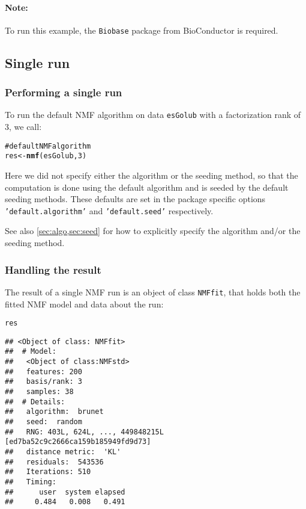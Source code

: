 \documentclass[a4paper]{article}\usepackage{graphicx, color}
\makeatletter
\newcommand{\hlfunctioncall}[1]{\textcolor[rgb]{0.501960784313725,0,0.329411764705882}{\textbf{#1}}}%
\newcommand{\hlcomment}[1]{\textcolor[rgb]{0.180392156862745,0.6,0.341176470588235}{#1}}%
\newenvironment{kframe}{%
 \def\at@end@of@kframe{}%
 \ifinner\ifhmode%
  \def\at@end@of@kframe{\end{minipage}}%
  \begin{minipage}{\columnwidth}%
 \fi\fi%
 \def\FrameCommand##1{\hskip\@totalleftmargin \hskip-\fboxsep
 \colorbox{shadecolor}{##1}\hskip-\fboxsep
     \hskip-\linewidth \hskip-\@totalleftmargin \hskip\columnwidth}%
 \MakeFramed {\advance\hsize-\width
   \@totalleftmargin\z@ \linewidth\hsize
   \@setminipage}}%
 {\par\unskip\endMakeFramed%
 \at@end@of@kframe}
\newenvironment{knitrout}{}{} %
\let\code=\texttt
\makeatother
\begin{document}

\paragraph{Note:} To run this example, the \code{Biobase} package from BioConductor is required.

\subsection{Single run}\label{sec:single_run}

\subsubsection{Performing a single run}
To run the default NMF algorithm on data \code{esGolub} with a factorization rank of 3, we call: 

\begin{knitrout}
\color{fgcolor}\begin{kframe}
\begin{alltt}
\hlcomment{# default NMF algorithm}
res <- \hlfunctioncall{nmf}(esGolub, 3)
\end{alltt}
\end{kframe}
\end{knitrout}


Here we did not specify either the algorithm or the seeding method, so that the computation is done using the default algorithm and is seeded by the 
default seeding methods.
These defaults are set in the package specific options \code{'default.algorithm'} 
and \code{'default.seed'} respectively.

See also \cref{sec:algo,sec:seed} for how to explicitly specify the algorithm and/or the seeding method.

\subsubsection{Handling the result}

The result of a single NMF run is an object of class \code{NMFfit}, that holds both the fitted NMF model and data about the run:

\begin{knitrout}
\color{fgcolor}\begin{kframe}
\begin{alltt}
res
\end{alltt}
\begin{verbatim}
## <Object of class: NMFfit>
##  # Model:
##   <Object of class:NMFstd>
##   features: 200 
##   basis/rank: 3 
##   samples: 38 
##  # Details:
##   algorithm:  brunet 
##   seed:  random 
##   RNG: 403L, 624L, ..., 449848215L [ed7ba52c9c2666ca159b185949fd9d73]
##   distance metric:  'KL' 
##   residuals:  543536 
##   Iterations: 510 
##   Timing:
##      user  system elapsed 
##     0.484   0.008   0.491
\end{verbatim}
\end{kframe}
\end{knitrout}
\end{document}
